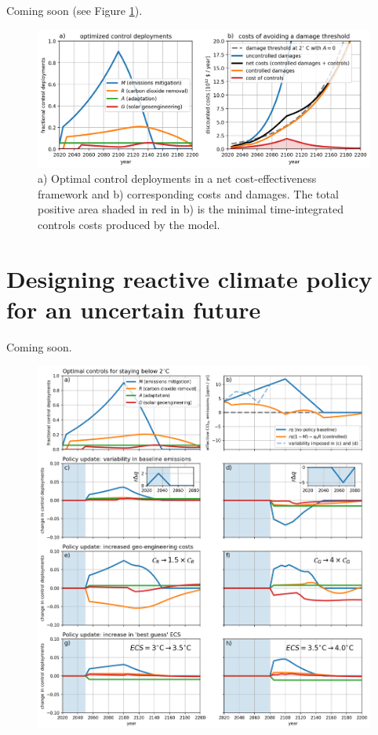 \documentclass{article}
\begin{document}
Coming soon (see Figure \ref{fig.approach2}).


\begin{figure}[htb!]
\noindent\includegraphics[width=1.0\textwidth]{figures/default-temp_controls_and_damages.png}
\centering
\caption{a) Optimal control deployments in a net cost-effectiveness framework and b) corresponding costs and damages. The total positive area shaded in red in b) is the minimal time-integrated controls costs produced by the model.}
\label{fig.approach2}
\end{figure}

\section{Designing reactive climate policy for an uncertain future}\label{sec.reactive}

Coming soon.

\begin{figure}[htb!]
\noindent\includegraphics[width=1.0\textwidth]{figures/policy_updates.png}
\centering
\caption{}
\label{fig.policy_updates}
\end{figure}
\end{document}
